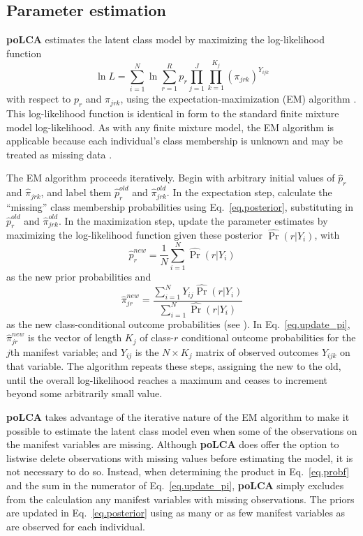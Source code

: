 \documentclass[letterpaper,12pt]{article}
\begin{document}
\subsection{Parameter estimation}

\textbf{poLCA} estimates the latent class model by maximizing the log-likelihood function
\begin{equation}
\ln L = \sum_{i=1}^N \ln \sum_{r=1}^R p_r \prod_{j=1}^J
\prod_{k=1}^{K_j} (\pi_{jrk})^{Y_{ijk}} \label{eq.loglik}
\end{equation}
with respect to $p_r$ and $\pi_{jrk}$, using the expectation-maximization (EM) algorithm \citep{DLR1977}.  This log-likelihood function is identical in form to the standard finite mixture model log-likelihood.  As with any finite mixture model, the EM algorithm is applicable because each individual's class membership is unknown and may be treated as missing data \citep{McLachlanKrishnan1997, McLachlanPeel2000}.

The EM algorithm proceeds iteratively. Begin with arbitrary initial values of $\hat{p}_r$ and $\hat \pi_{jrk}$, and label them $\hat{p}_r^{old}$ and $\hat \pi_{jrk}^{old}$. In the expectation step, calculate the ``missing'' class membership probabilities using Eq.~\ref{eq.posterior}, substituting in $\hat{p}_r^{old}$ and $\hat \pi_{jrk}^{old}$.  In the maximization step, update the parameter estimates by maximizing the log-likelihood function given these posterior $\widehat{\Pr}(r|Y_i)$, with
\begin{equation}
\hat{p}_r^{new} = \frac{1}{N} \sum_{i=1}^N \widehat{\Pr}(r|Y_i)
\label{eq.update_p}
\end{equation}
as the new prior probabilities and
\begin{equation}
\hat{\pi}_{jr}^{new} = \frac{\sum_{i=1}^N Y_{ij}
\widehat{\Pr}(r|Y_i)}{\sum_{i=1}^N \widehat{\Pr}(r|Y_i)}
\label{eq.update_pi}
\end{equation}
as the new class-conditional outcome probabilities (see \citet{EverittHand1981, Everitt1984}). In Eq.~\ref{eq.update_pi}, $\hat{\pi}_{jr}^{new}$ is the vector of length $K_j$ of class-$r$ conditional outcome probabilities for the $j$th manifest variable; and $Y_{ij}$ is the $N \times K_j$ matrix of observed outcomes $Y_{ijk}$ on that variable. The algorithm repeats these steps, assigning the new to the old, until the overall log-likelihood reaches a maximum and ceases to increment beyond some arbitrarily small value.

\textbf{poLCA} takes advantage of the iterative nature of the EM algorithm to make it possible to estimate the latent class model even when some of the observations on the manifest variables are missing. Although \textbf{poLCA} does offer the option to listwise delete observations with missing values before estimating the model, it is not necessary to do so. Instead, when determining the product in Eq.~\ref{eq.probf} and the sum in the numerator of Eq.~\ref{eq.update_pi}, \textbf{poLCA} simply excludes from the calculation any manifest variables with missing observations.  The priors are updated in Eq.~\ref{eq.posterior} using as many or as few manifest variables as are observed for each individual.
\end{document}
